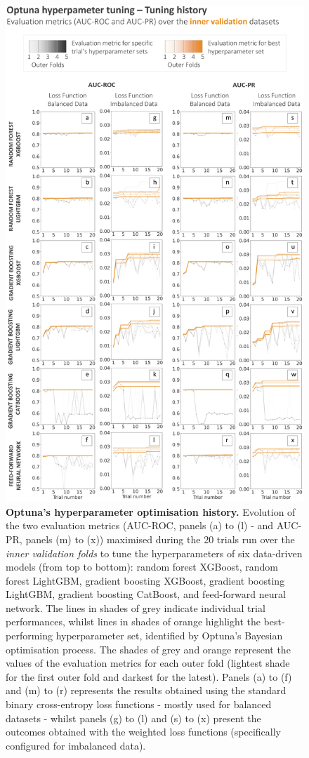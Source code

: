 \documentclass[nhess, manuscript]{copernicus}
\begin{document}
\begin{figure}[t]
\includegraphics[width=12cm]{figures/optuna_history.png}
\caption{\textbf{Optuna's hyperparameter optimisation history.} Evolution of the two evaluation metrics (AUC-ROC, panels (a) to (l) - and AUC-PR, panels (m) to (x)) maximised during the 20 trials run over the \textit{inner validation folds} to tune the hyperparameters of six data-driven models (from top to bottom): random forest XGBoost, random forest LightGBM, gradient boosting XGBoost, gradient boosting LightGBM, gradient boosting CatBoost, and feed-forward neural network. The lines in shades of grey indicate individual trial performances, whilst lines in shades of orange highlight the best-performing hyperparameter set, identified by Optuna's Bayesian optimisation process. The shades of grey and orange represent the values of the evaluation metrics for each outer fold (lightest shade for the first outer fold and darkest for the latest). Panels (a) to (f) and (m) to (r) represents the results obtained using the standard binary cross-entropy loss functions - mostly used for balanced datasets - whilst panels (g) to (l) and (s) to (x) present the outcomes obtained with the weighted loss functions (specifically configured for imbalanced data).}
\label{fig:optuna_history}
\end{figure}
\end{document}

